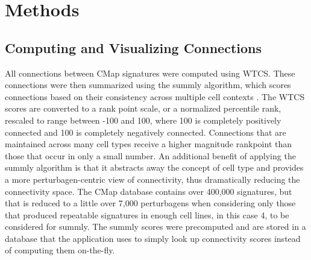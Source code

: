 \documentclass[12pt]{article}
\begin{document}



\section{Methods}
\subsection{Computing and Visualizing Connections}

All connections between CMap signatures were computed using WTCS. These connections were then summarized using the summly algorithm, which scores connections based on their consistency across multiple cell contexts \cite{subramanian_summly}. The WTCS scores are converted to a rank point scale, or a normalized percentile rank, rescaled to range between -100 and 100, where 100 is completely positively connected and 100 is completely negatively connected. Connections that are maintained across many cell types receive a higher magnitude rankpoint than those that occur in only a small number. An additional benefit of applying the summly algorithm is that it abstracts away the concept of cell type and provides a more perturbagen-centric view of connectivity, thus dramatically reducing the connectivity space. The CMap database contains over 400,000 signatures, but that is reduced to a little over 7,000 perturbagens when considering only those that produced repeatable signatures in enough cell lines, in this case 4, to be considered for summly. The summly scores were precomputed and are stored in a database that the application uses to simply look up connectivity scores instead of computing them on-the-fly. 
\end{document}
